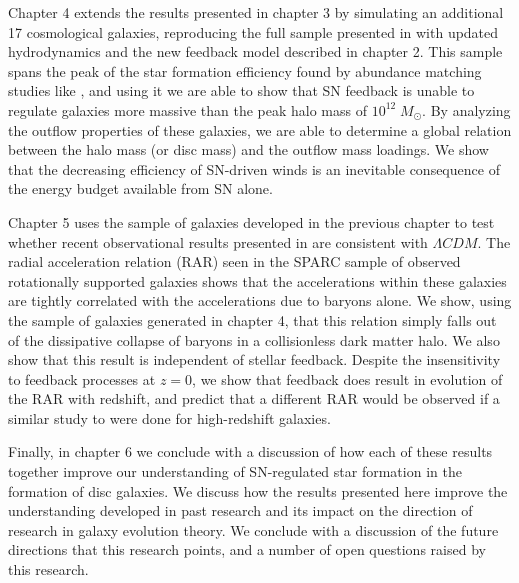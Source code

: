 Chapter 4 extends the results presented in chapter 3 by simulating an additional
17 cosmological galaxies, reproducing the full sample presented in
\citet{Stinson2010} with updated hydrodynamics and the new feedback model
described in chapter 2.  This sample spans the peak of the star formation
efficiency found by abundance matching studies like \citet{Moster2013}, and
using it we are able to show that SN feedback is unable to regulate
galaxies more massive than the peak halo mass of $10^{12}\;M_\odot$.  By
analyzing the outflow properties of these galaxies, we are able to determine a
global relation between the halo mass (or disc mass) and the outflow mass
loadings.  We show that the decreasing efficiency of SN-driven winds is an
inevitable consequence of the energy budget available from SN alone.

Chapter 5 uses the sample of galaxies developed in the previous chapter to
test whether recent observational results presented in \citet{McGaugh2016}
are consistent with $\Lambda CDM$.  The radial acceleration relation (RAR) seen in
the SPARC sample \citep{Lelli2016} of observed rotationally supported galaxies
shows that the accelerations within these galaxies are tightly correlated 
with the accelerations due to baryons alone.  We show, using the sample of
galaxies generated in chapter 4, that this relation simply falls out of the
dissipative collapse of baryons in a collisionless dark matter halo.  We also
show that this result is independent of stellar feedback.  Despite the insensitivity
to feedback processes at $z=0$, we show that feedback does result in evolution
of the RAR with redshift, and predict that a different RAR would be observed if
a similar study to \citet{Lelli2016} were done for high-redshift galaxies.

Finally, in chapter 6 we conclude with a discussion of how each of these results
together improve our understanding of SN-regulated star formation in the
formation of disc galaxies.  We discuss how the results presented here improve
the understanding developed in past research and its impact on the direction of
research in galaxy evolution theory.  We conclude with a discussion of the
future directions that this research points, and a number of open questions
raised by this research.



